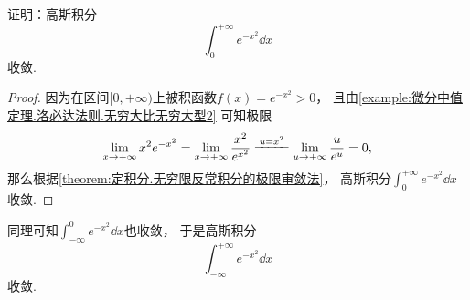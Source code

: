 \begin{example}\label{example:定积分.高斯积分的收敛性}
证明：高斯积分\begin{equation*}
	\int_0^{+\infty} e^{-x^2} \dd{x}
\end{equation*}收敛.
\begin{proof}
因为在区间\([0,+\infty)\)上被积函数\(f(x) = e^{-x^2} > 0\)，
且由\cref{example:微分中值定理.洛必达法则.无穷大比无穷大型2} 可知极限\begin{equation*}
	\lim_{x\to+\infty} x^2 e^{-x^2}
	= \lim_{x\to+\infty} \frac{x^2}{e^{x^2}}
	\xlongequal{u=x^2} \lim_{u\to+\infty} \frac{u}{e^u}
	= 0,
\end{equation*}
那么根据\cref{theorem:定积分.无穷限反常积分的极限审敛法}，
高斯积分\(\int_0^{+\infty} e^{-x^2} \dd{x}\)收敛.
\end{proof}
\end{example}
\begin{remark}
同理可知\(\int_{-\infty}^0 e^{-x^2} \dd{x}\)也收敛，
于是高斯积分\begin{equation*}
	\int_{-\infty}^{+\infty} e^{-x^2} \dd{x}
\end{equation*}收敛.
\end{remark}

